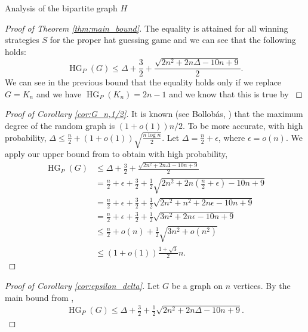 \documentclass[11pt, letterpaper]{article}
\theoremstyle{plain}
\theoremstyle{plain}
\begin{document}
\begin{section}{Analysis of the bipartite graph $H$}
\begin{proof}[Proof of Theorem \ref{thm:main_bound}]
The equality is attained for all winning strategies $S$ for the proper hat guessing game and we can see that the following holds:
$$\operatorname{HG}_{P}(G) \leq \Delta+\frac{3}{2}+ \frac{\sqrt{2n^{2}+2n\Delta-10n+9}}{2}. $$
We can see in the previous bound that the equality holds only if we replace $G = K_{n}$ and we have  $\operatorname{HG}_{P}(K_n) = 2n-1$ and we know that this is true by \cite{adriaensen2026hatguessingpropercolorings}
\end{proof}
\newpage
\begin{proof}[Proof of Corollary \ref{cor:G_n,1/2}] 
    It is known (see Bollobás, \cite{bollobas2001random}) that the maximum degree of the random graph is $(1+o(1))n/2$. To be more accurate, with high probability, $\Delta \leq \frac n 2 + (1+o(1)) \sqrt{\frac{n\log n}2}$. Let $\Delta = \frac n 2+ \epsilon$, where $\epsilon=o(n)$. We apply our upper bound from  to obtain with high probability,
    \begin{align*}
        \operatorname{HG}_{P}(G) &\leq \Delta + \frac{3}{2} + \frac{\sqrt{2n^2 + 2n\Delta - 10n + 9}}{2}
        \\&= \frac n 2 + \epsilon + \frac 3 2 + \frac 1 2 \sqrt{2n^2 + 2n\left(\frac n 2 + \epsilon\right) - 10n + 9}
        \\&= \frac n 2 + \epsilon + \frac 3 2 + \frac 1 2 \sqrt{2n^2 + n^2 + 2n\epsilon - 10n + 9}
        \\&= \frac n 2 + \epsilon + \frac 3 2 + \frac 1 2 \sqrt{3n^2 + 2n\epsilon - 10n + 9}
        \\&\leq \frac n 2 + o(n) + \frac 1 2 \sqrt{3n^2 + o(n^2)}
        \\&\leq (1+o(1)) \frac{1+\sqrt 3}{2}n.
    \end{align*}

\end{proof}
\begin{proof}[Proof of Corollary \ref{cor:epsilon_delta}]
Let $G$ be a graph on $n$ vertices. By the main bound from  ,
\begin{align*}
\operatorname{HG}_{P}(G) \leq \Delta + \frac{3}{2} + \frac{1}{2}\sqrt{2n^2 + 2n\Delta - 10n + 9}.
\end{align*}


\end{proof}
\end{section}
\end{document}
